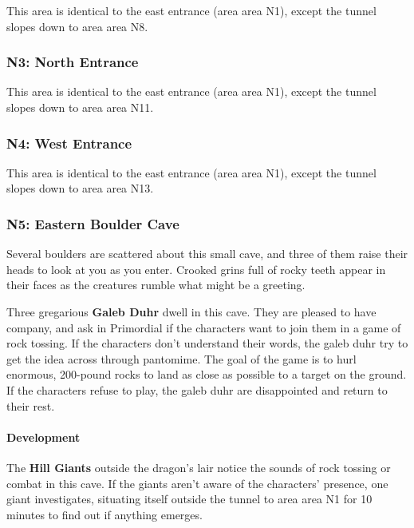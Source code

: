 \documentclass[letterpaper, 11pt, twocolumn]{dndbook}
\begin{document}
This area is identical to the east entrance (area area N1), except the tunnel slopes down to area area N8.

\subsubsection{N3: North Entrance}

This area is identical to the east entrance (area area N1), except the tunnel slopes down to area area N11.

\subsubsection{N4: West Entrance}

This area is identical to the east entrance (area area N1), except the tunnel slopes down to area area N13.

\subsubsection{N5: Eastern Boulder Cave}

\begin{DndReadAloud}
Several boulders are scattered about this small cave, and three of them raise their heads to look at you as you enter. Crooked grins full of rocky teeth appear in their faces as the creatures rumble what might be a greeting.
\end{DndReadAloud}

Three gregarious \textbf{Galeb Duhr} dwell in this cave. They are pleased to have company, and ask in Primordial if the characters want to join them in a game of rock tossing. If the characters don't understand their words, the galeb duhr try to get the idea across through pantomime. The goal of the game is to hurl enormous, 200-pound rocks to land as close as possible to a target on the ground. If the characters refuse to play, the galeb duhr are disappointed and return to their rest.

\paragraph{Development}

The \textbf{Hill Giants} outside the dragon's lair notice the sounds of rock tossing or combat in this cave. If the giants aren't aware of the characters' presence, one giant investigates, situating itself outside the tunnel to area area N1 for 10 minutes to find out if anything emerges.
\end{document}
